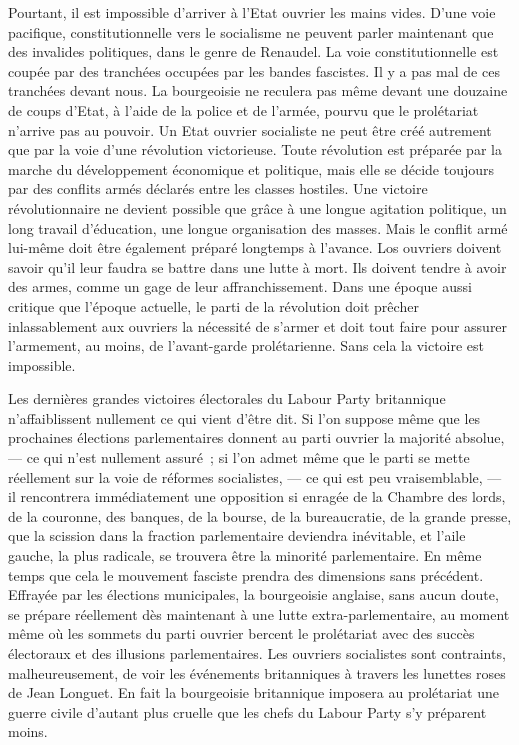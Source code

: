 \documentclass[french,twoside]{book} %
\begin{document}
Pourtant, il est impossible d’arriver à l’Etat ouvrier les mains vides. D’une voie pacifique, constitutionnelle vers le socialisme ne peuvent parler maintenant que des invalides politiques, dans le genre de Renaudel. La voie constitutionnelle est coupée par des tranchées occupées par les bandes fascistes. Il y a pas mal de ces tranchées devant  nous. La bourgeoisie ne reculera pas même devant une douzaine de coups d’Etat, à l’aide de la police et de l’armée, pourvu que le prolétariat n’arrive pas au pouvoir. Un Etat ouvrier socialiste ne peut être créé autrement que par la voie d’une révolution victorieuse. Toute révolution est préparée par la marche du développement économique et politique, mais elle se décide toujours par des conflits armés déclarés entre les classes hostiles. Une victoire révolutionnaire ne devient possible que grâce à une longue agitation politique, un long travail d’éducation, une longue organisation des masses. Mais le conflit armé lui-même doit être également préparé longtemps à l’avance. Los ouvriers doivent savoir qu’il leur faudra se battre dans une lutte à mort. Ils doivent tendre à avoir des armes, comme un gage de leur affranchissement. Dans une époque aussi critique que l’époque actuelle, le parti de la révolution doit prêcher inlassablement aux ouvriers la nécessité de s’armer et doit tout faire pour assurer l’armement, au moins, de l’avant-garde prolétarienne. Sans cela la victoire est impossible.\par
Les dernières grandes victoires électorales du Labour Party britannique n’affaiblissent nullement ce qui vient d’être dit. Si l’on suppose même que les prochaines élections parlementaires donnent au parti ouvrier la majorité absolue, — ce qui n’est nullement assuré ; si l’on admet même que le parti se mette réellement sur la voie de réformes socialistes, — ce qui est peu vraisemblable, — il rencontrera immédiatement une opposition si enragée de la Chambre des lords, de la couronne, des banques, de la bourse, de la bureaucratie, de la grande presse, que la scission dans la fraction parlementaire deviendra inévitable, et l’aile gauche, la plus radicale, se trouvera être la minorité parlementaire. En même temps que cela le mouvement fasciste prendra des dimensions sans précédent. Effrayée par les élections municipales, la bourgeoisie  anglaise, sans aucun doute, se prépare réellement dès maintenant à une lutte extra-parlementaire, au moment même où les sommets du parti ouvrier bercent le prolétariat avec des succès électoraux et des illusions parlementaires. Les ouvriers socialistes sont contraints, malheureusement, de voir les événements britanniques à travers les lunettes roses de Jean Longuet. En fait la bourgeoisie britannique imposera au prolétariat une guerre civile d’autant plus cruelle que les chefs du Labour Party s’y préparent moins.\par
\end{document}
